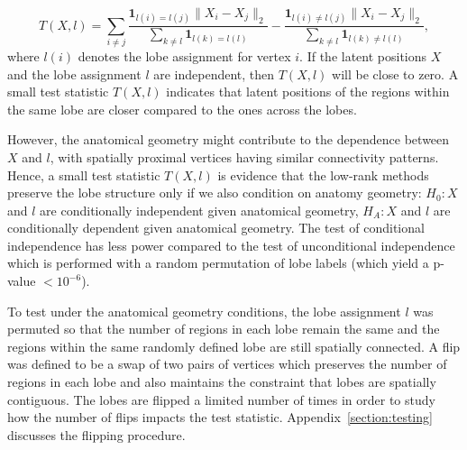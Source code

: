 \documentclass[journal,twoside,web]{ieeecolor}
\begin{document}
\begin{equation}
	T(X, l) = \sum_{i \ne j} \frac{\mathbf{1}_{l(i) = l(j)}\|X_i - X_j \|_2}{\sum_{k \ne l} \mathbf{1}_{l(k) = l(l)}} -
\frac{ \mathbf{1}_{l(i) \ne l(j)}\|X_i - X_j \|_2}{\sum_{k \ne l} \mathbf{1}_{l(k) \ne l(l)}}, \label{eq:test_stat}
\end{equation}
where $l(i)$ denotes the lobe assignment for vertex $i$.
If the latent positions $X$ and the lobe assignment $l$ are independent, then $T(X, l)$ will be close to zero.
A small test statistic $T(X, l)$ indicates that latent positions of the regions within the same lobe are closer compared to the ones across the lobes.


However, the anatomical geometry might contribute to the dependence between $X$ and $l$, with spatially proximal vertices having similar connectivity patterns.
Hence, a small test statistic $T(X, l)$ is evidence that the low-rank methods preserve the lobe structure only if we also condition on anatomy geometry:
$H_0: X$ and $l$ are conditionally independent given anatomical geometry,
$H_A: X$ and $l$ are conditionally dependent given anatomical geometry.
The test of conditional independence has less power compared to the test of unconditional independence which is performed with a random permutation of lobe labels (which yield a p-value $<10^{-6}$).

To test under the anatomical geometry conditions, the lobe assignment $l$ was permuted so that the number of regions in each lobe remain the same and the regions within the same randomly defined lobe are still spatially connected. 
A flip was defined to be a swap of two pairs of vertices which preserves the number of regions in each lobe and also maintains the constraint that lobes are spatially contiguous.
The lobes are flipped a limited number of times in order to study how the number of flips impacts the test statistic.
Appendix~\ref{section:testing} discusses the flipping procedure.
\end{document}
